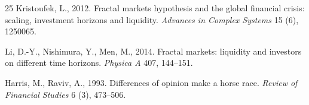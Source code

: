 \begin{thebibliography}{25}
Kristoufek, L., 2012.
Fractal markets hypothesis and the global financial crisis: scaling,
investment horizons and liquidity.
\textit{Advances in Complex Systems} 15 (6), 1250065.

Li, D.-Y., Nishimura, Y., Men, M., 2014.
Fractal markets: liquidity and investors on different time horizons.
\textit{Physica A} 407, 144--151.

Harris, M., Raviv, A., 1993.
Differences of opinion make a horse race.
\textit{Review of Financial Studies} 6 (3), 473--506.

\end{thebibliography}
